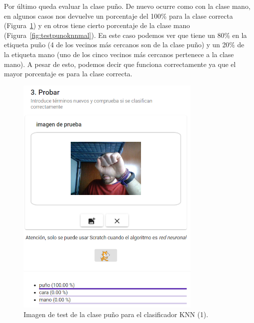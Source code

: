 \documentclass[a4paper, 12pt]{book}
\begin{document}
Por último queda evaluar la clase puño. De nuevo ocurre como con la clase mano, en algunos casos nos devuelve un porcentaje del 100\% para la clase correcta (Figura~\ref{fig:testpunoknnbien}) y en otros tiene cierto porcentaje de la clase mano (Figura~\ref{fig:testpunoknnmal}). En este caso podemos ver que tiene un 80\% en la etiqueta puño (4 de los vecinos más cercanos son de la clase puño) y un 20\% de la etiqueta mano (uno de los cinco vecinos más cercanos pertenece a la clase mano). A pesar de esto, podemos decir que funciona correctamente ya que el mayor porcentaje es para la clase correcta.

\begin{figure}
	\centering
	\includegraphics[width=9cm, keepaspectratio]{img/testpunoknnbien}
	\caption{Imagen de test de la clase puño para el clasificador KNN (1).}			
	\label{fig:testpunoknnbien}
\end{figure}
\end{document}
